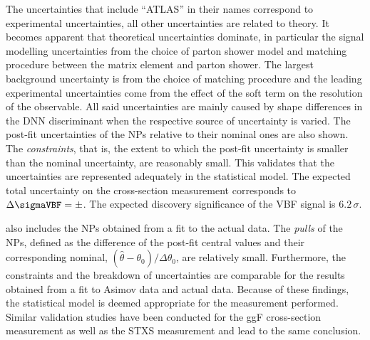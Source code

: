 The uncertainties that include ``ATLAS'' in their names correspond to experimental uncertainties, all other uncertainties are related to theory. 
It becomes apparent that theoretical uncertainties dominate, in particular the signal modelling uncertainties from the choice of parton shower model and matching procedure between the matrix element and parton shower. 
The largest background uncertainty is from the choice of \ttbar matching procedure and the leading experimental uncertainties come from the effect of the \MET soft term on the resolution of the \MET observable.  
All said uncertainties are mainly caused by shape differences in the DNN discriminant when the respective source of uncertainty is varied.
The post-fit uncertainties of the NPs relative to their nominal ones are also shown. The \emph{constraints}, that is, the extent to which the post-fit uncertainty is smaller than the nominal uncertainty, are reasonably small.
This validates that the uncertainties are represented adequately in the statistical model. 
The expected total uncertainty on the cross-section measurement corresponds to $\Delta \sigmaVBF = \pm  $. The expected discovery significance of the VBF signal is $6.2\,\sigma$. 

 also includes the NPs obtained from a fit to the actual data. 
The \emph{pulls} of the NPs, defined as the difference of the post-fit central values and their corresponding nominal, $(\hat{\theta} - \theta_0 ) / \Delta \theta_0$, are relatively small. 
Furthermore, the constraints and the breakdown of uncertainties are comparable for the results obtained from a fit to Asimov data and actual data. 
Because of these findings, the statistical model is deemed appropriate for the measurement performed. 
Similar validation studies have been conducted for the ggF cross-section measurement as well as the STXS measurement and lead to the same conclusion. 


